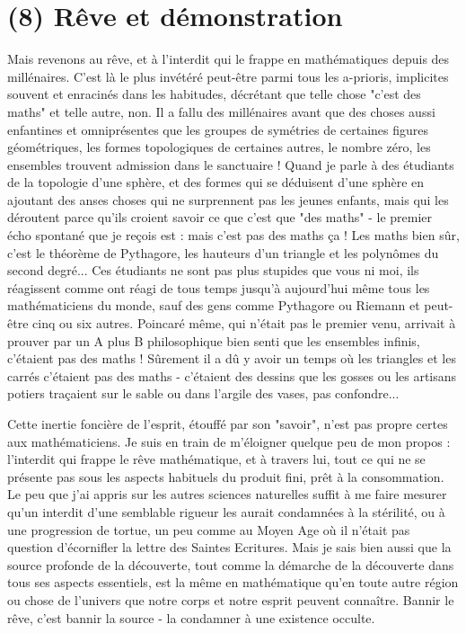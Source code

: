 \section{(8) Rêve et démonstration}

Mais revenons au rêve, et à l'interdit qui le frappe en mathématiques depuis des millénaires. C'est là le plus invétéré peut-être parmi tous les a-prioris, implicites souvent et enracinés dans les habitudes, décrétant que telle chose "c'est des maths" et telle autre, non. Il a fallu des millénaires avant que des choses aussi enfantines et omniprésentes que les groupes de symétries de certaines figures géométriques, les formes topologiques de certaines autres, le nombre zéro, les ensembles trouvent admission dans le sanctuaire ! Quand je parle à des étudiants de la topologie d'une sphère, et des formes qui se déduisent d'une sphère en ajoutant des anses choses qui ne surprennent pas les jeunes enfants, mais qui les déroutent parce qu'ils croient savoir ce que c'est que "des maths" - le premier écho spontané que je reçois est : mais c'est pas des maths ça ! Les maths bien sûr, c'est le théorème de Pythagore, les hauteurs d'un triangle et les polynômes du second degré... Ces étudiants ne sont pas plus stupides que vous ni moi, ils réagissent comme ont réagi de tous temps jusqu'à aujourd'hui même tous les mathématiciens du monde, sauf des gens comme Pythagore ou Riemann et peut-être cinq ou six autres. Poincaré même, qui n'était pas le premier venu, arrivait à prouver par un A plus B philosophique bien senti que les ensembles infinis, c'étaient pas des maths ! Sûrement il a dû y avoir un temps où les triangles et les carrés c'étaient pas des maths - c'étaient des dessins que les gosses ou les artisans potiers traçaient sur le sable ou dans l'argile des vases, pas confondre...

Cette inertie foncière de l'esprit, étouffé par son "savoir", n'est pas propre certes aux mathématiciens. Je suis en train de m'éloigner quelque peu de mon propos : l'interdit qui frappe le rêve mathématique, et à travers lui, tout ce qui ne se présente pas sous les aspects habituels du produit fini, prêt à la consommation. Le peu que j'ai appris sur les autres sciences naturelles suffit à me faire mesurer qu'un interdit d'une semblable rigueur les aurait condamnées à la stérilité, ou à une progression de tortue, un peu comme au Moyen Age où il n'était pas question d'écornifler la lettre des Saintes Ecritures. Mais je sais bien aussi que la source profonde de la découverte, tout comme la démarche de la découverte dans tous ses aspects essentiels, est la même en mathématique qu'en toute autre région ou chose de l'univers que notre corps et notre esprit peuvent connaître. Bannir le rêve, c'est bannir la source - la condamner à une existence occulte.

